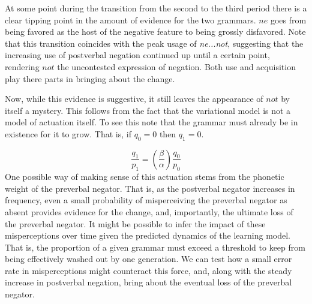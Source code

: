 At some point during the transition from the second to the third period there is a clear tipping point in the amount of evidence for the two grammars. $ne$ goes from being favored as the host of the negative feature to being grossly disfavored. Note that this transition coincides with the peak usage of \emph{ne...not}, suggesting that the increasing use of postverbal negation continued up until a certain point, rendering $not$ the uncontested expression of negation. Both use and acquisition play there parts in bringing about the change.

Now, while this evidence is suggestive, it still leaves the appearance of $not$ by itself a mystery. This follows from the fact that the variational model is not a model of actuation itself. To see this note that the grammar must already be in existence for it to grow. That is, if $q_0 = 0$ then $q_1=0$.

\begin{equation}
     \frac{q_1}{p_1} = \left( \frac{\beta}{\alpha} \right)\frac{q_0}{p_0}
\end{equation}
One possible way of making sense of this actuation stems from the phonetic weight of the preverbal negator. That is, as the postverbal negator increases in frequency, even a small probability of misperceiving the preverbal negator as absent provides evidence for the change, and, importantly, the ultimate loss of the preverbal negator. It might be possible to infer the impact of these misperceptions over time given the predicted dynamics of the learning model. That is, the proportion of a given grammar must exceed a threshold to keep from being effectively washed out by one generation. We can test how a small error rate in misperceptions might counteract this force, and, along with the steady increase in postverbal negation, bring about the eventual loss of the preverbal negator. 